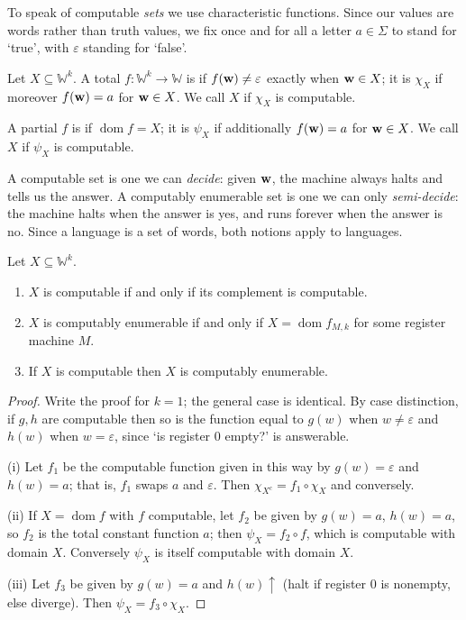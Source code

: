 \documentclass[a4paper]{scrartcl}
\newcommand{\WW}{\mathbb{W}}
\newcommand{\dom}{\operatorname{dom}}
\newcommand{\eps}{\varepsilon}
\begin{document}
To speak of computable \emph{sets} we use characteristic functions. Since our values are words rather than truth values, we fix once and for all a letter $a \in \Sigma$ to stand for `true', with $\eps$ standing for `false'.

\begin{definition}
	Let $X \subseteq \WW^k$. A total $f \colon \WW^k \to \WW$ is  if $f(\vv w) \neq \eps$ exactly when $\mathbf{w} \in X$; it is  $\chi_X$ if moreover $f(\mathbf{w}) = a$ for $\mathbf{w} \in X$. We call $X$  if $\chi_X$ is computable.

	A partial $f$ is  if $\dom f = X$; it is  $\psi_X$ if additionally $f(\mathbf{w}) = a$ for $\mathbf{w} \in X$. We call $X$  if $\psi_X$ is computable.
\end{definition}

A computable set is one we can \emph{decide}: given $\mathbf{w}$, the machine always halts and tells us the answer. A computably enumerable set is one we can only \emph{semi-decide}: the machine halts when the answer is yes, and runs forever when the answer is no. Since a language is a set of words, both notions apply to languages.

\begin{proposition}\label{prop:cecomputable}
	Let $X \subseteq \WW^k$.
	\begin{enumerate}[label=(\roman*)]
		\item $X$ is computable if and only if its complement is computable.
		\item $X$ is computably enumerable if and only if $X = \dom f_{M,k}$ for some register machine $M$.
		\item If $X$ is computable then $X$ is computably enumerable.
	\end{enumerate}
\end{proposition}

\begin{proof}
	Write the proof for $k = 1$; the general case is identical. By case distinction, if $g,h$ are computable then so is the function equal to $g(w)$ when $w \neq \eps$ and $h(w)$ when $w = \eps$, since `is register $0$ empty?' is answerable.

	(i) Let $f_1$ be the computable function given in this way by $g(w) = \eps$ and $h(w) = a$; that is, $f_1$ swaps $a$ and $\eps$. Then $\chi_{X^c} = f_1 \circ \chi_X$ and conversely.

	(ii) If $X = \dom f$ with $f$ computable, let $f_2$ be given by $g(w) = a$, $h(w) = a$, so $f_2$ is the total constant function $a$; then $\psi_X = f_2 \circ f$, which is computable with domain $X$. Conversely $\psi_X$ is itself computable with domain $X$.

	(iii) Let $f_3$ be given by $g(w) = a$ and $h(w) \uparrow$ (halt if register $0$ is nonempty, else diverge). Then $\psi_X = f_3 \circ \chi_X$.
\end{proof}
\end{document}
